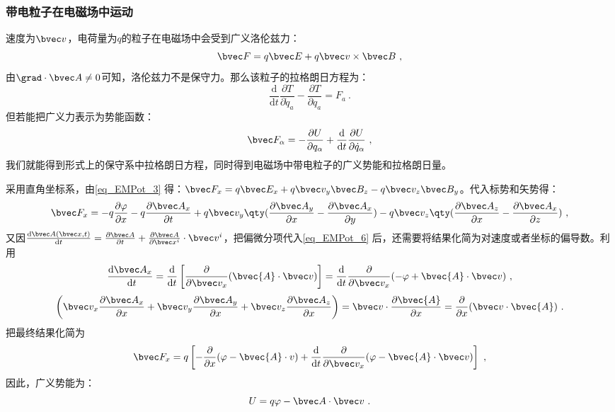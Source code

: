 \subsubsection{带电粒子在电磁场中运动}
速度为$\bvec v$，电荷量为$q$的粒子在电磁场中会受到广义洛伦兹力：
\begin{equation}\label{eq_EMPot_3}
\bvec F=q\bvec E+q\bvec v \times \bvec B
~,\end{equation}
由$\grad \cdot \bvec A\neq 0$可知，洛伦兹力不是保守力。那么该粒子的拉格朗日方程为：
\begin{equation}
\frac{\mathrm{d}}{\mathrm{d} t} \frac{\partial T}{\partial \dot{q}_a}-\frac{\partial T}{\partial q_a}=F_a~.
\end{equation}
但若能把广义力表示为势能函数：
\begin{equation}
\bvec F_{\alpha}=-\frac{\partial U}{\partial q_{\alpha}}+\frac{\mathrm{d}}{\mathrm{d}t}\frac{\partial U}{\partial \dot q_{\alpha}}~,
\end{equation}
我们就能得到形式上的保守系中拉格朗日方程，同时得到电磁场中带电粒子的广义势能和拉格朗日量。

采用直角坐标系，由\autoref{eq_EMPot_3} 得：$\bvec F_x=q\bvec E_x+q\bvec v_y\bvec B_z-q\bvec v_z\bvec B_y$。代入标势和矢势得：
\begin{equation}\label{eq_EMPot_6}
\bvec F_x=-q\frac{\partial \varphi}{\partial x}-q\frac{\partial \bvec A_x}{\partial t}+q\bvec v_y\qty(\frac{\partial \bvec A_y}{\partial x}-\frac{\partial \bvec A_x}{\partial y})-q\bvec v_z\qty(\frac{\partial \bvec A_z}{\partial x}-\frac{\partial \bvec A_x}{\partial z})~,
\end{equation}
又因$\frac{\mathrm{d}\bvec A(\bvec x,t)}{\mathrm{d}t}=\frac{\partial \bvec A}{\partial t}+\frac{\partial \bvec A}{\partial \bvec x^i}\cdot \bvec v^i$，把偏微分项代入\autoref{eq_EMPot_6} 后，还需要将结果化简为对速度或者坐标的偏导数。利用
\begin{equation}
\frac{\mathrm{d} \bvec A_x}{\mathrm{~d} t}=\frac{\mathrm{d}}{\mathrm{d} t}\left[\frac{\partial}{\partial \bvec v_x}(\bvec {A} \cdot \bvec v)\right]=\frac{\mathrm{d}}{\mathrm{d} t} \frac{\partial}{\partial \bvec v_x}(-\varphi+\bvec {A} \cdot \bvec v)~,
\end{equation}
\begin{equation}
\left(\bvec v_x \frac{\partial \bvec A_x}{\partial x}+\bvec v_y \frac{\partial \bvec A_y}{\partial x}+\bvec v_z \frac{\partial \bvec A_z}{\partial x}\right)=\bvec v \cdot \frac{\partial \bvec {A}}{\partial x}=\frac{\partial}{\partial x}(\bvec v \cdot \bvec {A}) ~.
\end{equation}
把最终结果化简为
\begin{equation}
\bvec F_x=q\left[-\frac{\partial}{\partial x}(\varphi-\bvec {A} \cdot v)+\frac{\mathrm{d}}{\mathrm{d} t} \frac{\partial}{\partial \bvec v_x}(\varphi-\bvec {A} \cdot \bvec v)\right]~,
\end{equation}
因此，广义势能为：
\begin{equation}
U=q\varphi -\bvec A\cdot \bvec v~.
\end{equation}